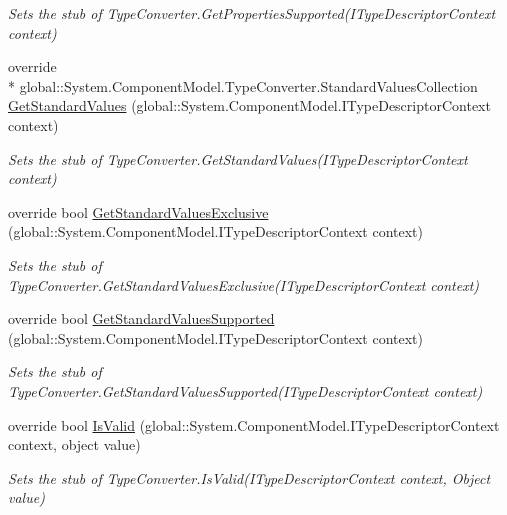 \begin{DoxyCompactItemize}
\begin{DoxyCompactList}\small\item\em Sets the stub of Type\-Converter.\-Get\-Properties\-Supported(\-I\-Type\-Descriptor\-Context context)\end{DoxyCompactList}\item 
override \\*
global\-::\-System.\-Component\-Model.\-Type\-Converter.\-Standard\-Values\-Collection \hyperlink{class_system_1_1_component_model_1_1_fakes_1_1_stub_guid_converter_a9c0a8f9168d0fcf391a2bdda9cd849cd}{Get\-Standard\-Values} (global\-::\-System.\-Component\-Model.\-I\-Type\-Descriptor\-Context context)
\begin{DoxyCompactList}\small\item\em Sets the stub of Type\-Converter.\-Get\-Standard\-Values(\-I\-Type\-Descriptor\-Context context)\end{DoxyCompactList}\item 
override bool \hyperlink{class_system_1_1_component_model_1_1_fakes_1_1_stub_guid_converter_a4eb9640127de232ca1c5e1d7bab4a4e1}{Get\-Standard\-Values\-Exclusive} (global\-::\-System.\-Component\-Model.\-I\-Type\-Descriptor\-Context context)
\begin{DoxyCompactList}\small\item\em Sets the stub of Type\-Converter.\-Get\-Standard\-Values\-Exclusive(\-I\-Type\-Descriptor\-Context context)\end{DoxyCompactList}\item 
override bool \hyperlink{class_system_1_1_component_model_1_1_fakes_1_1_stub_guid_converter_a743e8bd69a657caf5ab91b08502c76ae}{Get\-Standard\-Values\-Supported} (global\-::\-System.\-Component\-Model.\-I\-Type\-Descriptor\-Context context)
\begin{DoxyCompactList}\small\item\em Sets the stub of Type\-Converter.\-Get\-Standard\-Values\-Supported(\-I\-Type\-Descriptor\-Context context)\end{DoxyCompactList}\item 
override bool \hyperlink{class_system_1_1_component_model_1_1_fakes_1_1_stub_guid_converter_af76b9877b041edb85dfead4a69a4382e}{Is\-Valid} (global\-::\-System.\-Component\-Model.\-I\-Type\-Descriptor\-Context context, object value)
\begin{DoxyCompactList}\small\item\em Sets the stub of Type\-Converter.\-Is\-Valid(\-I\-Type\-Descriptor\-Context context, Object value)\end{DoxyCompactList}\end{DoxyCompactItemize}
